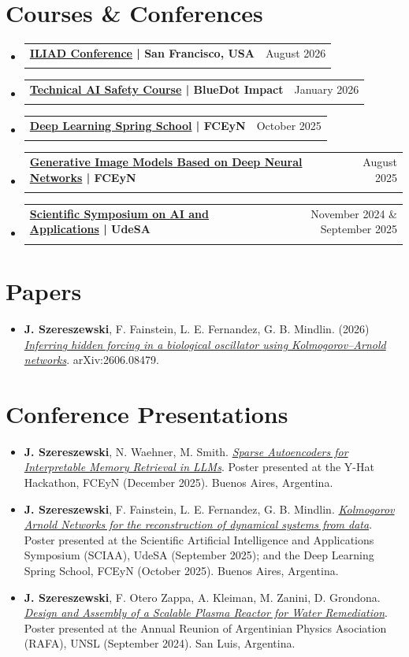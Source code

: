 \documentclass[letterpaper,11pt]{article}
\makeatletter
\newcommand{\resumeItem}[4]{
  \vspace{-2pt}\item
    \begin{tabular*}{\textwidth}[t]{l@{\extracolsep{\fill}}r}
      \textbf{#1} & #2 \\
      {\parbox[t]{0.7\textwidth}{\small#3}} & \textit{\small \textcolor{mygray}{#4}} \\
    \end{tabular*}\vspace{-7pt}
}
\newcommand{\resumeEvent}[1]{
  \item
  \textnormal{#1}\vspace{-7pt}
}
\newcommand{\resumeSectionStart}{\begin{itemize}[leftmargin=0pt, label={}]}
\newcommand{\resumeSectionEnd}{\end{itemize}}
\makeatother
\begin{document}
\section{Courses \& Conferences}
  \resumeSectionStart
    \resumeItem
      {\href{https://www.iliadconference.com/}{ILIAD Conference} | San Francisco, USA}
      {August 2026}
      {}
      {}
    \vspace{-14pt}
    \resumeItem
      {\href{https://bluedot.org/courses/technical-ai-safety}{Technical AI Safety Course} | BlueDot Impact}
      {January 2026}
      {}
      {}
    \vspace{-14pt}
    \resumeItem
      {\href{https://primavera-dl.github.io/}{Deep Learning Spring School} | FCEyN}
      {October 2025}
      {}
      {}
    \vspace{-14pt}
    \resumeItem
      {\href{https://eci.dc.uba.ar/cursos-eci/}{Generative Image Models Based on Deep Neural Networks} | FCEyN}
      {August 2025}
      {}
      {}
    \vspace{-14pt}
    \resumeItem
      {\href{https://udesa.edu.ar/sciaa}{Scientific Symposium on AI and Applications} | UdeSA}
      {November 2024 \& September 2025}
      {}
      {}
    \vspace{-14pt}
  \resumeSectionEnd

\section{Papers}
  \resumeSectionStart
    \resumeEvent
      {\textbf{J. Szereszewski}, F. Fainstein, L. E. Fernandez, G. B. Mindlin. (2026)
      \textit{\href{http://arxiv.org/abs/2606.08479}{Inferring hidden forcing in a biological oscillator using Kolmogorov--Arnold networks}}. arXiv:2606.08479.}
  \resumeSectionEnd

\section{Conference Presentations}
  \resumeSectionStart
    \resumeEvent
      {\textbf{J. Szereszewski}, N. Waehner, M. Smith.
      \textit{\href{https://julianszere.github.io/curriculum/posters/sae.pdf}{Sparse Autoencoders for Interpretable Memory Retrieval in LLMs}}. Poster presented at the Y-Hat Hackathon, FCEyN (December 2025). Buenos Aires, Argentina.}
    \resumeEvent
      {\textbf{J. Szereszewski}, F. Fainstein, L. E. Fernandez, G. B. Mindlin. \textit{\href{https://julianszere.github.io/curriculum/posters/kan.pdf}{Kolmogorov Arnold Networks for the reconstruction of dynamical systems from data}}. Poster presented at the Scientific Artificial Intelligence and Applications Symposium (SCIAA), UdeSA (September 2025); and the Deep Learning Spring School, FCEyN (October 2025). Buenos Aires, Argentina.}
    \resumeEvent
      {\textbf{J. Szereszewski}, F. Otero Zappa, A. Kleiman, M. Zanini, D. Grondona. \textit{\href{https://julianszere.github.io/curriculum/posters/plasma.pdf}{Design and Assembly of a Scalable Plasma Reactor for Water Remediation}}. Poster presented at the Annual Reunion of Argentinian Physics Asociation (RAFA), UNSL (September 2024). San Luis, Argentina.}
  \resumeSectionEnd
\end{document}
